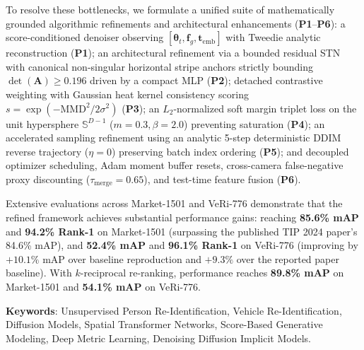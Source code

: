 To resolve these bottlenecks, we formulate a unified suite of mathematically grounded algorithmic refinements and architectural enhancements (\textbf{P1}--\textbf{P6}):
a score-conditioned denoiser observing $[\boldsymbol{\theta}_t, \mathbf{f}_g, \mathbf{t}_{\text{emb}}]$ with Tweedie analytic reconstruction (\textbf{P1});
an architectural refinement via a bounded residual STN with canonical non-singular horizontal stripe anchors strictly bounding $\det(\mathbf{A}) \ge 0.196$ driven by a compact MLP (\textbf{P2});
detached contrastive weighting with Gaussian heat kernel consistency scoring $s = \exp(-\text{MMD}^2/2\sigma^2)$ (\textbf{P3});
an $L_2$-normalized soft margin triplet loss on the unit hypersphere $\mathbb{S}^{D-1}$ ($m=0.3, \beta=2.0$) preventing saturation (\textbf{P4});
an accelerated sampling refinement using an analytic 5-step deterministic DDIM reverse trajectory ($\eta = 0$) preserving batch index ordering (\textbf{P5}); and
decoupled optimizer scheduling, Adam moment buffer resets, cross-camera false-negative proxy discounting ($\tau_{\text{merge}}=0.65$), and test-time feature fusion (\textbf{P6}).

Extensive evaluations across Market-1501 and VeRi-776 demonstrate that the refined framework achieves substantial performance gains: reaching \textbf{85.6\% mAP} and \textbf{94.2\% Rank-1} on Market-1501 (surpassing the published TIP 2024 paper's 84.6\% mAP), and \textbf{52.4\% mAP} and \textbf{96.1\% Rank-1} on VeRi-776 (improving by $+10.1\%$ mAP over baseline reproduction and $+9.3\%$ over the reported paper baseline). With $k$-reciprocal re-ranking, performance reaches \textbf{89.8\% mAP} on Market-1501 and \textbf{54.1\% mAP} on VeRi-776.

\vspace{0.4\baselineskip}
\noindent
\textbf{Keywords}: Unsupervised Person Re-Identification, Vehicle Re-Identification, Diffusion Models, Spatial Transformer Networks, Score-Based Generative Modeling, Deep Metric Learning, Denoising Diffusion Implicit Models.
\endgroup
